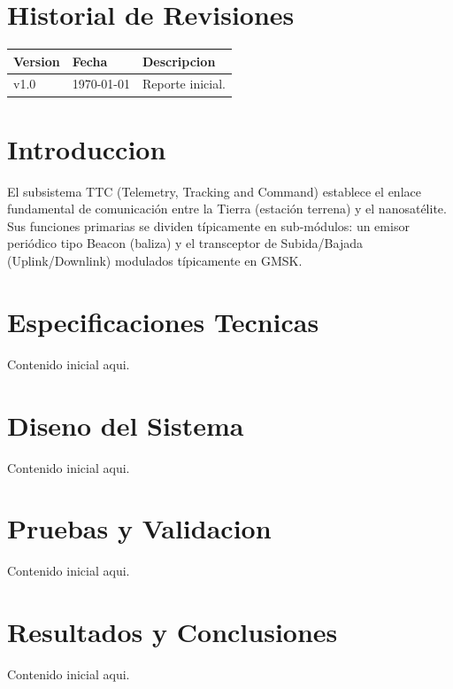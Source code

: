 \documentclass[a4paper, twoside, 12pt]{report}
\begin{document}

\begin{abstract}
    Escribe aqui el resumen ejecutivo del reporte.
\end{abstract}

\chapter*{Historial de Revisiones}
\begin{center}
\begin{tabular}{p{2cm} p{3cm} p{9cm}}
\toprule
\textbf{Version} & \textbf{Fecha} & \textbf{Descripcion} \\
\midrule
v1.0 & \today & Reporte inicial. \\
\bottomrule
\end{tabular}
\end{center}

\clearpage
\tableofcontents
\listoffigures
\listoftables
\clearpage


\chapter{Introduccion}
El subsistema TTC (Telemetry, Tracking and Command) establece el enlace fundamental de comunicación entre la Tierra (estación terrena) y el nanosatélite. Sus funciones primarias se dividen típicamente en sub-módulos: un emisor periódico tipo Beacon (baliza) y el transceptor de Subida/Bajada (Uplink/Downlink) modulados típicamente en GMSK.

\chapter{Especificaciones Tecnicas}
Contenido inicial aqui.

\chapter{Diseno del Sistema}
Contenido inicial aqui.

\chapter{Pruebas y Validacion}
Contenido inicial aqui.

\chapter{Resultados y Conclusiones}
Contenido inicial aqui.

% 
% 
\end{document}
